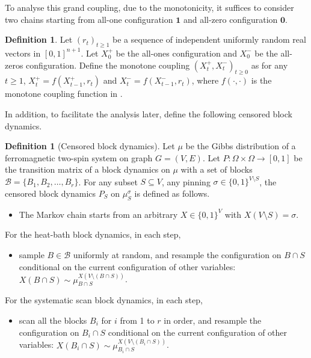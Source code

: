 \documentclass[11pt]{amsart}
\def\*#1{\mathbf{#1}}
\def\+#1{\mathcal{#1}}
\theoremstyle{definition}
\newtheorem{definition}[theorem]{Definition}
\theoremstyle{remark}
\begin{document}
To analyse this grand coupling, due to the monotonicity, it suffices to consider two chains starting from all-one configuration $\*1$ and all-zero configuration $\*0$.

\begin{definition}\label{def:monotone-coupling}
Let $(r_t)_{t \geq 1}$ be a sequence of independent uniformly random real vectors in $[0,1]^{n+1}$. Let $X^+_0$ be the all-ones configuration and $X^-_0$ be the all-zeros configuration. Define the monotone coupling $(X^+_t,X^-_t)_{t \geq 0}$ as for any $t \geq 1$, $X^+_t = f(X^+_{t-1},r_t)$ and $X^-_t = f(X^-_{t-1},r_t)$, where $f(\cdot,\cdot)$ is the monotone coupling function in .
\end{definition}

In addition, to facilitate the analysis later, define the following censored block dynamics.

\begin{definition}[Censored block dynamics]
    Let $\mu$ be the Gibbs distribution of a ferromagnetic two-spin system on graph $G=(V,E)$.
    Let $P:\Omega \times \Omega \to [0,1]$ be the transition matrix of a block dynamics on $\mu$ with a set of blocks $\+B = \{B_1,B_2,\ldots,B_r\}$. For any subset $S \subseteq V$, any pinning $\sigma \in \{0,1\}^{V \setminus S}$,  the censored block dynamics $P_S$ on $\mu_S^\sigma$ is defined as follows. 
    \begin{itemize}
        \item The Markov chain starts from an arbitrary $X \in \{0,1\}^V$ with $X(V \setminus S) = \sigma$.
    \end{itemize}
    For the heat-bath block dynamics, in each step, 
    \begin{itemize}
        \item sample $B \in \+B$ uniformly at random, and resample the configuration on $B \cap S$ conditional on the current configuration of other variables: $X(B \cap S) \sim \mu_{B \cap S}^{X(V \setminus (B \cap S))}$.
    \end{itemize}
    For the systematic scan block dynamics, in each step,
    \begin{itemize}
        \item scan all the blocks $B_i$ for $i$ from 1 to $r$ in order, and resample the configuration on $B_i \cap S$ conditional on the current configuration of other variables: $X(B_i \cap S) \sim \mu_{B_i \cap S}^{X(V \setminus (B_i \cap S))}$.
    \end{itemize}
    \end{definition}
    
\end{document}
